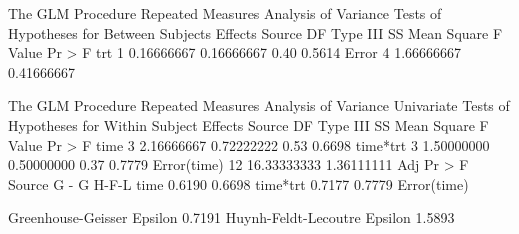 \documentclass{article}
\begin{document}
\begin{Woutput}
The GLM Procedure
Repeated Measures Analysis of Variance
Tests of Hypotheses for Between Subjects Effects
Source                    DF   Type III SS   Mean Square  F Value  Pr > F
trt                        1    0.16666667    0.16666667     0.40  0.5614
Error                      4    1.66666667    0.41666667

The GLM Procedure
Repeated Measures Analysis of Variance
Univariate Tests of Hypotheses for Within Subject Effects
Source                    DF   Type III SS   Mean Square  F Value  Pr > F
time                       3    2.16666667    0.72222222     0.53  0.6698
time*trt                   3    1.50000000    0.50000000     0.37  0.7779
Error(time)               12   16.33333333    1.36111111
                         Adj Pr > F
Source                 G - G     H-F-L
time                  0.6190    0.6698
time*trt              0.7177    0.7779
Error(time)

Greenhouse-Geisser Epsilon      0.7191
Huynh-Feldt-Lecoutre Epsilon    1.5893
\end{Woutput}
\end{document}
